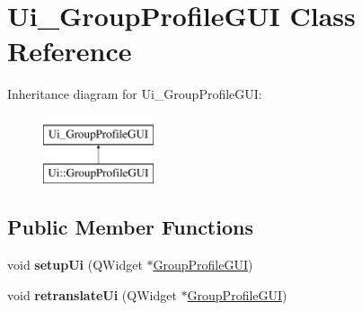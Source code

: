 \hypertarget{classUi__GroupProfileGUI}{}\section{Ui\+\_\+\+Group\+Profile\+G\+UI Class Reference}
\label{classUi__GroupProfileGUI}
Inheritance diagram for Ui\+\_\+\+Group\+Profile\+G\+UI\+:\begin{figure}[H]
\begin{center}
\leavevmode
\includegraphics[height=2.000000cm]{classUi__GroupProfileGUI}
\end{center}
\end{figure}
\subsection*{Public Member Functions}
\begin{DoxyCompactItemize}
\item 
void {\bfseries setup\+Ui} (Q\+Widget $\ast$\hyperlink{classGroupProfileGUI}{Group\+Profile\+G\+UI})\hypertarget{classUi__GroupProfileGUI_a19b8ac1c53af68663ecf330ad6e51a2a}{}\label{classUi__GroupProfileGUI_a19b8ac1c53af68663ecf330ad6e51a2a}

\item 
void {\bfseries retranslate\+Ui} (Q\+Widget $\ast$\hyperlink{classGroupProfileGUI}{Group\+Profile\+G\+UI})\hypertarget{classUi__GroupProfileGUI_a562788cb7bb7520c41c3ad2cfd954af4}{}\label{classUi__GroupProfileGUI_a562788cb7bb7520c41c3ad2cfd954af4}

\end{DoxyCompactItemize}
